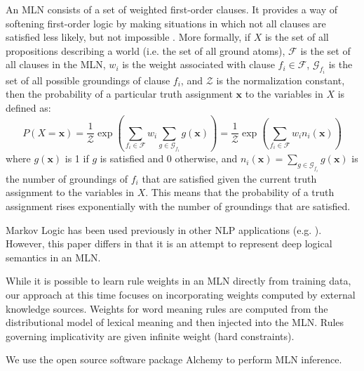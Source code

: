 An MLN consists of a set of weighted first-order clauses.  It provides a way of
softening first-order logic by making situations in which not all clauses are
satisfied less likely, but not impossible \citep{richardson:mlj06}. More
formally, if $X$ is the set of all propositions describing a world (i.e. the
set of all ground atoms), $\mathcal{F}$ is the set of all clauses in the MLN,
$w_i$ is the weight associated with clause $f_i \in \mathcal{F}$,
$\mathcal{G}_{f_i}$ is the set of all possible groundings of clause $f_i$, and
$\mathcal{Z}$ is the normalization constant, then the probability of a
particular truth assignment $\mathbf{x}$ to the variables in $X$ is defined as:
\[ P(X = \mathbf{x}) = \frac{1}{\mathcal{Z}} \exp\left(\sum_{f_i \in
\mathcal{F}} w_i \sum_{g \in \mathcal{G}_{f_i}}g(\mathbf{x}) \right) =
\frac{1}{\mathcal{Z}} \exp\left(\sum_{f_i \in \mathcal{F}} w_i n_i(\mathbf{x})
\right) \] where $g(\mathbf{x})$ is 1 if $g$ is satisfied and
0 otherwise, and $n_i(\mathbf{x})= \sum_{g\in \mathcal{G}_{f_i}}g(\mathbf{x})$
is the number of groundings of $f_i$ that are satisfied given the current truth
assignment to the variables in $X$. This means that the probability of a truth
assignment rises exponentially with the number of groundings that are satisfied.

Markov Logic has been used previously in other NLP applications
(e.g. \citet{poon:emnlp2009}).  However, this paper differs in that it is an
attempt to represent deep logical semantics in an MLN.

While it is possible to learn rule weights in an MLN directly from training data,
our approach at this time focuses on incorporating weights computed
by external knowledge sources.  Weights for word meaning rules are computed from
the distributional model of lexical meaning and then injected into the MLN. 
Rules governing implicativity are given infinite weight (hard constraints).

We use the open source software package Alchemy \citep{kok:tr05} to perform MLN
inference.
